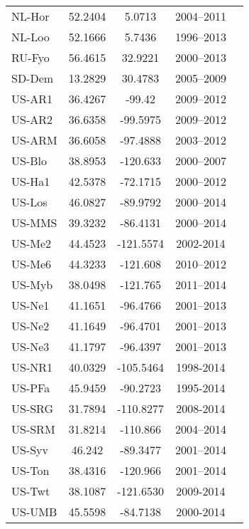 \begin{longtable}{lcccc}
NL-Hor &  52.2404 &  5.0713 &  2004–2011 &  \cite{van2004}\\
NL-Loo &  52.1666 &  5.7436 &  1996–2013 &  \cite{Dolman2002}\\
RU-Fyo &  56.4615 &  32.9221 &  2000–2013 &  \cite{Kurbatova2008}\\
SD-Dem &  13.2829 &  30.4783 &  2005–2009 &  \cite{Sjostrom2009}\\
US-AR1 &  36.4267 &  -99.42 &  2009–2012 &  \cite{Billesbach2016}\\
US-AR2 &  36.6358 &  -99.5975 &  2009–2012 &  \cite{Billesbach2016}\\
US-ARM &  36.6058 &  -97.4888 &  2003–2012 &  \cite{Fischer2007}\\
US-Blo &  38.8953 &  -120.633 &  2000–2007 &  \cite{Goldstein2000}\\
US-Ha1 &  42.5378 &  -72.1715 &  2000–2012 &  \cite{Urbanski2007}\\
US-Los &  46.0827 &  -89.9792 &  2000–2014 &  \cite{Sulman2009}\\
US-MMS &  39.3232 &  -86.4131 &  2000–2014 &  \cite{Schmid2000}\\
US-Me2 & 44.4523 & -121.5574 & 2002-2014 & \cite{Law2006}\\
US-Me6 &  44.3233 &  -121.608 &  2010–2012 &  \cite{Ruehr2012}\\
US-Myb &  38.0498 &  -121.765 &  2011–2014 &  \cite{Sturtevant2016}\\
US-Ne1 &  41.1651 &  -96.4766 &  2001–2013 &  \cite{Verma2005}\\
US-Ne2 &  41.1649 &  -96.4701 &  2001–2013 &  \cite{Verma2005}\\
US-Ne3 &  41.1797 &  -96.4397 &  2001–2013 &  \cite{Verma2005}\\
US-NR1 &  40.0329 & -105.5464 & 1998-2014 & \cite{Monson2002} \\
US-PFa & 45.9459 & -90.2723 & 1995-2014 & \cite{Desai2015}\\
US-SRG & 31.7894 & -110.8277 & 2008-2014 & \cite{Scott2015}\\
US-SRM &  31.8214 &  -110.866 &  2004–2014 &  \cite{Scott2010}\\
US-Syv &  46.242 &  -89.3477 &  2001–2014 &  \cite{Desai2005}\\
US-Ton &  38.4316 &  -120.966 &  2001–2014 &  \cite{Baldocchi2004}\\
US-Twt & 38.1087 & -121.6530 & 2009-2014 & \cite{Hatala2012}\\
US-UMB & 45.5598 & -84.7138 & 2000-2014 & \cite{Rothstein2000}\\

\end{longtable}
